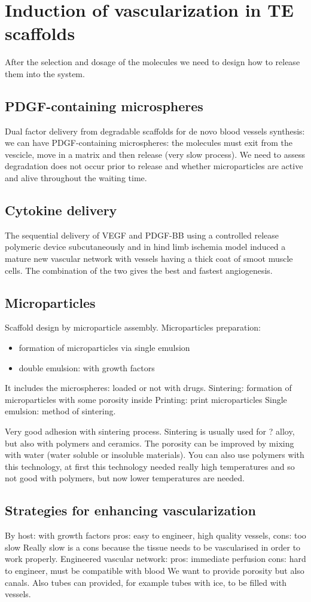 \section{Induction of vascularization in TE scaffolds}
After the selection and dosage of the molecules we need to design how to release them into the system.

\subsection{PDGF-containing microspheres}
Dual factor delivery from degradable scaffolds for de novo blood vessels synthesis: we can have PDGF-containing microspheres: the molecules must exit from the vescicle, move in a matrix and then release (very slow process). We need to assess degradation does not occur prior to release and whether microparticles are active and alive throughout the waiting time.
\subsection{Cytokine delivery}
The sequential delivery of VEGF and PDGF-BB using a controlled release polymeric device subcutaneously and in hind limb ischemia model induced a mature new vascular network with vessels having a thick coat of smoot muscle cells. The combination of the two gives the best and fastest angiogenesis.
\subsection{Microparticles}
Scaffold design by microparticle assembly. Microparticles preparation:
\begin{itemize}
\item formation of microparticles via single emulsion
\item  double emulsion: with growth factors
\end{itemize}

It includes the microspheres: loaded or not with drugs.
Sintering: formation of microparticles with some porosity inside
Printing: print microparticles Single emulsion: method of sintering.

Very good adhesion with sintering process. Sintering is usually used for ? alloy, but also with polymers and ceramics.
The porosity can be improved by mixing with water (water soluble or insoluble materials).
You can also use polymers with this technology, at first this technology needed really high temperatures and so not good with polymers, but now lower temperatures are needed.

\subsection{Strategies for enhancing vascularization}
By host: with growth factors pros: easy to engineer, high quality vessels, cons: too slow
Really slow is a cons because the tissue needs to be vascularised in order to work properly.
Engineered vascular network:
pros: immediate perfusion
cons: hard to engineer, must be compatible with blood We want to provide porosity but also canals.
Also tubes can provided, for example tubes with ice, to be filled with vessels.
